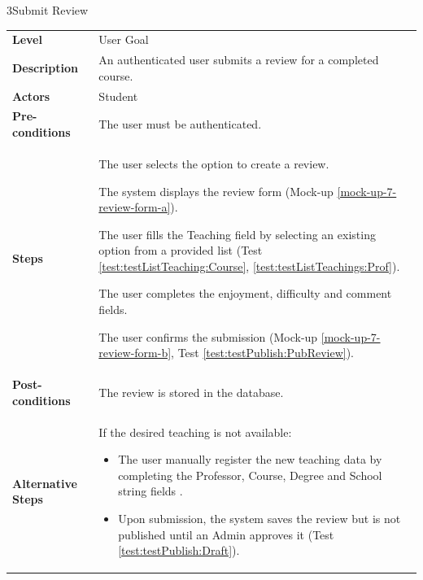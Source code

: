 \begin{usecasetable}{3}{Submit Review}
	\begin{tabularx}{\textwidth}{@{} l|X @{}}
		\textbf{Level} & User Goal \\
		\textbf{Description} & An authenticated user submits a review for a completed course. \\
		\textbf{Actors} & Student \\
		\textbf{Pre-conditions} & The user must be authenticated. \\
		\textbf{Steps} &
		\begin{tabenum}
			\item The user selects the option to create a review.
			\item The system displays the review form (Mock-up \ref{mock-up-7-review-form-a}).
			\item The user fills the Teaching field by selecting an existing option from a provided list (Test \ref{test:testListTeaching:Course}, \ref{test:testListTeachings:Prof}).
			\item The user completes the enjoyment, difficulty and comment fields.
			\item The user confirms the submission (Mock-up \ref{mock-up-7-review-form-b}, Test \ref{test:testPublish:PubReview}).
		\end{tabenum} \\
		\textbf{Post-conditions} & The review is stored in the database. \\
		\textbf{Alternative Steps} & \begin{tabitem}
			\item[3a.] If the desired teaching is not available: 
			\begin{itemize}
				\item The user manually register the new teaching data by completing the Professor, Course, Degree and School string fields .
				\item Upon submission, the system saves the review but is not published until an Admin approves it (Test \ref{test:testPublish:Draft}).
			\end{itemize} 
		\end{tabitem}
	\end{tabularx}
\end{usecasetable}


